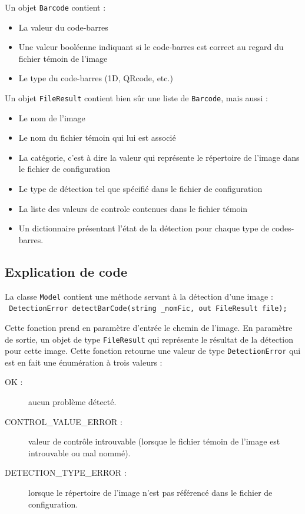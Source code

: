 Un objet \verb|Barcode| contient :
\begin{itemize}
\item La valeur du code-barres
\item Une valeur booléenne indiquant si le code-barres est correct au regard du fichier témoin de l'image
\item Le type du code-barres (1D, QRcode, etc.)
\end{itemize}

Un objet \verb|FileResult| contient bien sûr une liste de \verb|Barcode|, mais aussi :
\begin{itemize}
\item Le nom de l'image
\item Le nom du fichier témoin qui lui est associé
\item La catégorie, c'est à dire la valeur qui représente le répertoire de l'image dans le fichier de configuration
\item Le type de détection tel que spécifié dans le fichier de configuration
\item La liste des valeurs de controle contenues dans le fichier témoin
\item Un dictionnaire présentant l'état de la détection pour chaque type de codes-barres.
\end{itemize}

\subsection{Explication de code}

La classe \verb|Model| contient une méthode servant à la détection d'une image :\\\verb| DetectionError detectBarCode(string _nomFic, out FileResult file);|

Cette fonction prend en paramètre d'entrée le chemin de l'image. En paramètre de sortie, un objet de type \verb|FileResult| qui représente le résultat de la détection pour cette image. Cette fonction retourne une valeur de type \verb|DetectionError| qui est en fait une énumération à trois valeurs :
\begin{description}
\item[OK :] aucun problème détecté.
\item[CONTROL\_VALUE\_ERROR :] valeur de contrôle introuvable (lorsque le fichier témoin de l'image est introuvable ou mal nommé).
\item[DETECTION\_TYPE\_ERROR :] lorsque le répertoire de l'image n'est pas référencé dans le fichier de configuration.
\end{description}

